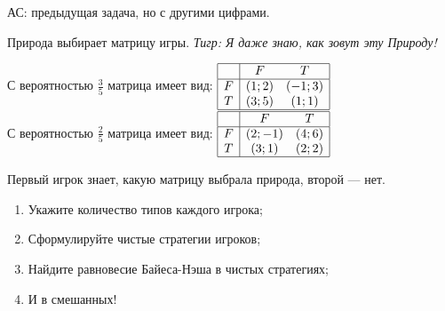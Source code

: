 \begin{problem}
{\red АС: предыдущая задача, но с другими цифрами.}

Природа выбирает матрицу игры. {\it Тигр: Я даже знаю, как зовут эту Природу!}\par
С вероятностью  $\frac{3}{5} $  матрица имеет вид:  $\begin{array}{|c|cc|}  \hline {} & {F} & {T} \\  \hline {F} & {\left(1;2\right)} & {\left(-1;3\right)} \\ {T} & {\left(3;5\right)} & {\left(1;1\right)} \\  \hline  \end{array}$ \\
С вероятностью  $\frac{2}{5} $  матрица имеет вид:  $\begin{array}{|c|cc|}  \hline {} & {F} & {T} \\  \hline {F} & {\left(2;-1\right)} & {\left(4;6\right)} \\ {T} & {\left(3;1\right)} & {\left(2;2\right)} \\  \hline  \end{array}$

Первый игрок знает, какую матрицу выбрала природа, второй — нет.\par
\begin{enumerate}
\item	Укажите количество типов каждого игрока;\par
\item 	Сформулируйте чистые стратегии игроков;\par
\item 	Найдите равновесие Байеса-Нэша в чистых стратегиях;\par
\item	И в смешанных!\par
\end{enumerate}


\begin{sol}

\end{sol}
\end{problem}


